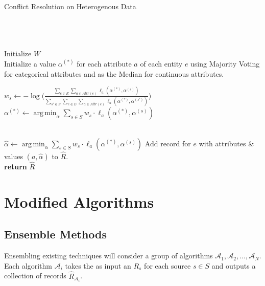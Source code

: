 \documentclass{acm_proc_article-sp}
\DeclareMathOperator*{\argmin}{arg\,min}
\begin{document}
\begin{algorithm}
\small
\caption{Conflict Resolution on Heterogenous Data}
\begin{algorithmic}[1]
 \\
 \\
 \\

\State Initialize $W$ \\

\State Initialize a value $\alpha^{(*)}$ for each attribute $a$ of each entity $e$ using Majority Voting for categorical attributes and as the Median for continuous attributes.  

\State $w_s \leftarrow - \log \big ( \frac{\sum_{e \in E} \sum_{a \in Attr(e)} \ell_a(\alpha^{(*)}, \alpha^{(s)})}{\sum_{s' \in S} \sum_{e \in E}  \sum_{a \in Attr(e)} \ell_a(\alpha^{(*)}, \alpha^{(s')})} \big )$
\State $\alpha^{(*)} \leftarrow \argmin_\alpha \sum_{s \in S} w_s \cdot \ell_a(\alpha^{(*)}, \alpha^{(s)})$
\EndFor
\EndFor
\EndWhile

\\

\State $\hat{\alpha} \leftarrow \argmin_\alpha \sum_{s \in S} w_s \cdot \ell_a(\alpha^{(*)}, \alpha^{(s)})$
\EndFor
\State Add record for $e$ with attributes \& values $(a, \hat{\alpha})$ to $\hat{R}$.
\EndFor
\\

\State \textbf{return} $\hat{R}$
\EndFunction
\end{algorithmic}
\label{alg:crh}
\end{algorithm}  

\section{Modified Algorithms}

\subsection{Ensemble Methods}

Ensembling existing techniques will consider a group of algorithms $\mathcal{A}_1,\mathcal{A}_2,\dots,\mathcal{A}_N$. Each algorithm $\mathcal{A}_i$ takes the as input an $R_s$ for each source $s \in S$ and outputs a collection of records $\hat{R}_{\mathcal{A}_i}$. 
\end{document}
